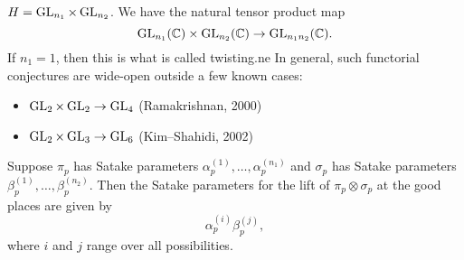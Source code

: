\documentclass[reqno]{amsart} 
\begin{document}
\begin{example}
  $H = \operatorname{GL}_{n_1} \times \operatorname{GL}_{n_2}$.  We have the natural tensor product map
  \begin{equation*}
    \operatorname{GL}_{n_1}(\mathbb{C}) \times \operatorname{GL}_{n_2}(\mathbb{C}) \rightarrow \operatorname{GL}_{n_1 n_2}(\mathbb{C}).
  \end{equation*}
  If $n_1 = 1$, then this is what is called twisting.ne In general, such functorial conjectures are wide-open outside a few known cases:
  \begin{itemize}
  \item $\operatorname{GL}_2 \times \operatorname{GL}_2 \rightarrow \operatorname{GL}_4$ (Ramakrishnan, 2000)
  \item $\operatorname{GL}_2 \times \operatorname{GL}_3 \rightarrow \operatorname{GL}_6$ (Kim--Shahidi, 2002)
  \end{itemize}
  Suppose $\pi_p$ has Satake parameters $\alpha_{p}^{(1)}, \dotsc, \alpha_{p}^{(n_1)}$ and $\sigma_p$ has Satake parameters $\beta_{p}^{(1)}, \dotsc, \beta_{p}^{(n_2)}$.  Then the Satake parameters for the lift of $\pi_p \otimes \sigma_p$ at the good places are given by
  \begin{equation*}
    \alpha_p^{(i)}
    \beta_p^{(j)},
  \end{equation*}
  where $i$ and $j$ range over all possibilities.
\end{example}
\end{document}
